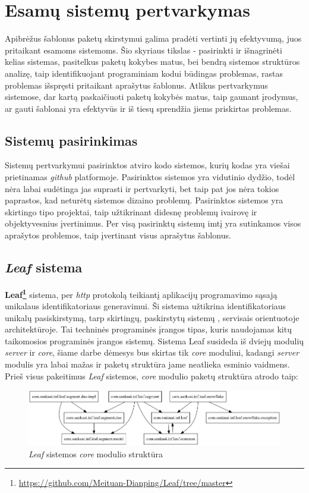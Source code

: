\section{Esamų sistemų pertvarkymas}
Apibrėžus šablonus paketų skirstymui galima pradėti vertinti jų efektyvumą, juos pritaikant esamoms sistemoms.
Šio skyriaus tikslas - pasirinkti ir išnagrinėti kelias sistemas, pasitelkus paketų kokybes matus, bei bendrą sistemos struktūros analizę,
taip identifikuojant programiniam kodui būdingas problemas, rastas problemas išspręsti pritaikant aprašytus šablonus.
Atlikus pertvarkymus sistemose, dar kartą paskaičiuoti paketų kokybės matus,
taip gaunant įrodymus, ar gauti šablonai yra efektyvūs ir iš tiesų sprendžia
jiems priskirtas problemas.


\subsection{Sistemų pasirinkimas}
Sistemų pertvarkymui pasirinktos atviro kodo sistemos, kurių kodas yra viešai prietinamas \textit{github} platformoje.
Pasirinktos sistemos yra vidutinio dydžio, todėl nėra labai sudėtinga jas suprasti ir pertvarkyti, bet taip pat jos nėra
tokios paprastos, kad neturėtų sistemos dizaino problemų.
Pasirinktos sistemos yra skirtingo tipo projektai, taip užtikrinant didesnę problemų ivairovę ir objektyvesnius įvertinimus.
Per visą pasirinktų sistemų imtį yra sutinkamos visos aprašytos problemos, taip įvertinant visus aprašytus šablonus.

\subsection{\textit{Leaf} sistema}
\textbf{Leaf\footnote{\url{https://github.com/Meituan-Dianping/Leaf/tree/master}}} sistema, per \textit{http}
protokolą teikiantį aplikacijų programavimo sąsają unikalaus identifikatoriaus generavimui.
Ši sistema užtikrina identifikatoriaus unikalų pasiskirstymą, tarp skirtingų, paskirstytų sistemų ,
servisais orientuotoje  architektūroje.
Tai techninės programinės įrangos tipas, kuris naudojamas kitų taikomosios programinės įrangos sistemų.
Sistema Leaf susideda iš dviejų modulių \textit{server} ir \textit{core}, šiame darbe dėmesys bus skirtas tik \textit{core} moduliui,
kadangi \textit{server} modulis yra labai mažas
ir paketų struktūra jame neatlieka esminio vaidmens.
Prieš visus pakeitimus \textit{Leaf} sistemos, \textit{core} modulio paketų struktūra atrodo taip:
\begin{figure}[H]
    \centering
    \includegraphics[scale=0.5]{img/leaf_packages_orig}
    \caption{\textit{Leaf} sistemos \textit{core} modulio struktūra}
    \label{img:leaf_packages_orig}
\end{figure}

